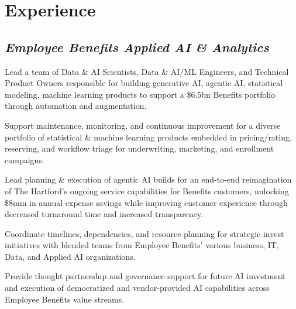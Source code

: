 \documentclass[letterpaper]{deedy-resume} %
\begin{document}
\begin{minipage}[t]{0.65\textwidth}
	\section{Experience}
		\hfill{}
		\sectionspace

		\subsection{\emph{Employee Benefits Applied AI \& Analytics}}
			\hfill
			\vspace{\topsep}
			\begin{tightitemize}
				\item Lead a team of Data \& AI Scientists, Data \& AI/ML Engineers, and Technical Product Owners responsible for building generative AI, agentic AI, statistical modeling, machine learning products to support a \$6.5bn Benefits portfolio through automation and augmentation.
				\item Support maintenance, monitoring, and continuous improvement for a diverse portfolio of statistical \& machine learning products embedded in pricing/rating, reserving, and workflow triage for underwriting, marketing, and enrollment campaigns.
				\item Lead planning \& execution of agentic AI builds for an end-to-end reimagination of The Hartford's ongoing service capabilities for Benefits customers, unlocking \$8mm in annual expense savings while improving customer experience through decreased turnaround time and increased transparency.
				\item Coordinate timelines, dependencies, and resource planning for strategic invest initiatives with blended teams from Employee Benefits' various business, IT, Data, and Applied AI organizations.
				\item Provide thought partnership and governance support for future AI investment and execution of democratized and vendor-provided AI capabilities across Employee Benefits value streams.
			\end{tightitemize}
		\sectionspace
		

\end{minipage}
\end{document}
